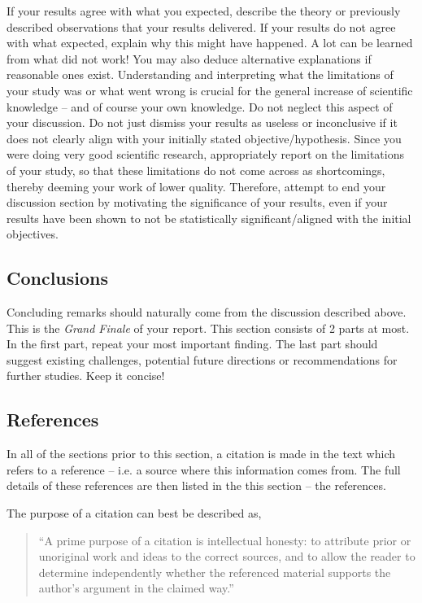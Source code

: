 If your results agree with what you expected, describe the theory
or previously described observations that your results delivered.
If your results do not agree with what expected, explain why this
might have happened. A lot can be learned from what
did not work! You may also deduce alternative explanations if reasonable
ones exist. Understanding and interpreting what the limitations of
your study was or what went wrong is crucial for the general increase of scientific
knowledge -- and of course your own knowledge. Do not neglect this aspect of your discussion.
Do not just dismiss your results as useless or inconclusive if it does
not clearly align with your initially stated objective/hypothesis.
Since you were doing very good scientific research, appropriately
report on the limitations of your study, so that these limitations do not come across
as shortcomings, thereby deeming your work of lower quality. Therefore, attempt
to end your discussion section by motivating the significance of your
results, even if your results have been shown to not be statistically significant/aligned with the initial objectives.


\subsection{Conclusions}
\label{sec:Conclusions}

Concluding remarks should naturally come from the discussion described
above. This is the \textit{Grand Finale} of your report. This section consists of 2 parts at most. In the first part, repeat your most important finding. The last part should 
suggest existing challenges, potential future directions or recommendations
for further studies. Keep it concise!


\subsection{References}
\label{sec:References}

In all of the sections prior to this section, a citation is made in the text which refers to a reference -- i.e. a source where this information comes from. The full details of these references are then listed in the this section -- the references.

The purpose of a citation can best be described as,
\begin{quote}
\textquotedblleft{}A prime purpose of a citation is intellectual honesty: to attribute prior or unoriginal work and ideas to the correct sources, and to allow the reader to determine independently whether the referenced material supports the author's argument in the claimed way.\textquotedblright{}\cite{citation}
\end{quote}

